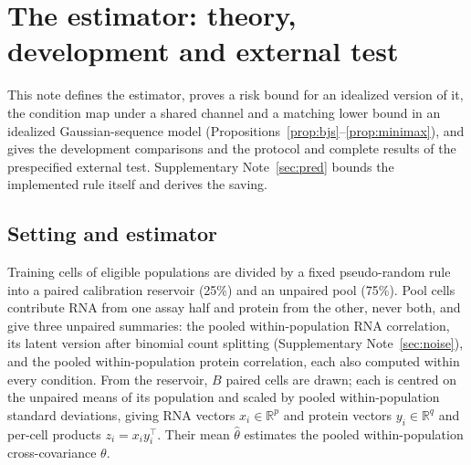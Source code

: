 \section{The estimator: theory, development and external test}\label{sec:semi}

This note defines the estimator, proves a risk bound for an idealized version of it, the condition map under a shared channel and a matching lower bound in an idealized Gaussian-sequence model (Propositions~\ref{prop:bjs}--\ref{prop:minimax}), and gives the development comparisons and the protocol and complete results of the prespecified external test. Supplementary Note~\ref{sec:pred} bounds the implemented rule itself and derives the saving.

\subsection*{Setting and estimator}
Training cells of eligible populations are divided by a fixed pseudo-random rule into a paired calibration reservoir (25\%) and an unpaired pool (75\%). Pool cells contribute RNA from one assay half and protein from the other, never both, and give three unpaired summaries: the pooled within-population RNA correlation, its latent version after binomial count splitting (Supplementary Note~\ref{sec:noise}), and the pooled within-population protein correlation, each also computed within every condition. From the reservoir, $B$ paired cells are drawn; each is centred on the unpaired means of its population and scaled by pooled within-population standard deviations, giving RNA vectors $x_i\in\mathbb{R}^p$ and protein vectors $y_i\in\mathbb{R}^q$ and per-cell products $z_i=x_iy_i^\top$. Their mean $\hat\theta$ estimates the pooled within-population cross-covariance $\theta$.

